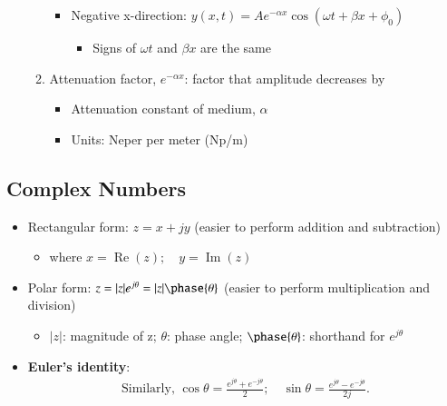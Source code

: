 \documentclass[a4paper]{article}
\begin{document}
\begin{itemize}
\begin{enumerate}
\begin{itemize}[label=$\circ$]
\begin{itemize}[label=\tiny$\blacksquare$]
        \end{itemize}
        \item Negative x-direction: $y(x, t) = Ae^{-\alpha x}\cos{\left(\omega t +\beta x + \phi_{0}\right)}$
        \begin{itemize}[label=\tiny$\blacksquare$]
            \item Signs of $\omega t$ and $\beta x$ are the same
        \end{itemize}
    \end{itemize}
    \item Attenuation factor, $e^{-\alpha x}$: factor that amplitude decreases by
    \begin{itemize}[label=$\circ$]
    \item Attenuation constant of medium, $\alpha$
    \item Units: Neper per meter (Np/m)
    
    \medskip
    
    \begin{center}
    \end{center}
    \end{itemize}
\end{enumerate}
\end{itemize}

\subsection{Complex Numbers}
\begin{itemize}
    \item Rectangular form: $z = x+jy$ \quad (easier to perform addition and subtraction)
    \begin{itemize}[label=$\circ$]
        \item where $x=\operatorname{Re}(z); \quad y = \operatorname{Im}(z)$
    \end{itemize}
    \item Polar form: $z=|z|e^{j\theta}=|z|\phase{\theta}$ \quad (easier to perform multiplication and division)
    \begin{itemize}[label=$\circ$]
        \item $|z|$: magnitude of z; \quad $\theta$: phase angle; \quad $\phase{\theta}$: shorthand for $e^{j\theta}$
    \end{itemize}
    \item \textbf{Euler's identity}: 
    \begin{align*}
        \text{Similarly, }\cos\theta = \frac{e^{j\theta}+e^{-j\theta}}{2};\quad \sin\theta = \frac{e^{j\theta}-e^{-j\theta}}{2j}.
    \end{align*}
\end{itemize}
\end{document}
